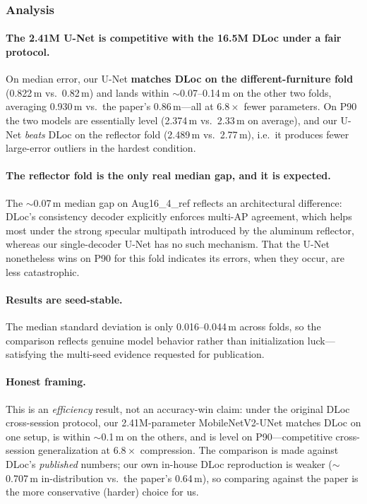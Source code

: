 \documentclass[11pt,a4paper]{article}
\begin{document}
\subsubsection{Analysis}

\paragraph{The 2.41M U-Net is competitive with the 16.5M DLoc under a fair protocol.}
On median error, our U-Net \textbf{matches DLoc on the different-furniture fold} (0.822\,m vs.\ 0.82\,m) and lands within $\sim$0.07--0.14\,m on the other two folds, averaging 0.930\,m vs.\ the paper's 0.86\,m---all at $6.8\times$ fewer parameters.
On P90 the two models are essentially level (2.374\,m vs.\ 2.33\,m on average), and our U-Net \emph{beats} DLoc on the reflector fold (2.489\,m vs.\ 2.77\,m), i.e.\ it produces fewer large-error outliers in the hardest condition.

\paragraph{The reflector fold is the only real median gap, and it is expected.}
The $\sim$0.07\,m median gap on Aug16\_4\_ref reflects an architectural difference: DLoc's consistency decoder explicitly enforces multi-AP agreement, which helps most under the strong specular multipath introduced by the aluminum reflector, whereas our single-decoder U-Net has no such mechanism.
That the U-Net nonetheless wins on P90 for this fold indicates its errors, when they occur, are less catastrophic.

\paragraph{Results are seed-stable.}
The median standard deviation is only 0.016--0.044\,m across folds, so the comparison reflects genuine model behavior rather than initialization luck---satisfying the multi-seed evidence requested for publication.

\paragraph{Honest framing.}
This is an \emph{efficiency} result, not an accuracy-win claim: under the original DLoc cross-session protocol, our 2.41M-parameter MobileNetV2-UNet matches DLoc on one setup, is within $\sim$0.1\,m on the others, and is level on P90---competitive cross-session generalization at $6.8\times$ compression.
The comparison is made against DLoc's \emph{published} numbers; our own in-house DLoc reproduction is weaker ($\sim$0.707\,m in-distribution vs.\ the paper's 0.64\,m), so comparing against the paper is the more conservative (harder) choice for us.
\end{document}
